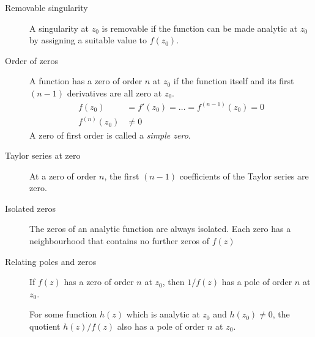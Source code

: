 \begin{description}
    \item[Removable singularity] A singularity at $ z_0 $ is removable if the function
        can be made analytic at $ z_0 $ by assigning a suitable value to $ f(z_0) $.

    \item[Order of zeros] A function has a zero of order $ n $ at $ z_0 $ if the
        function itself and its first $ (n-1) $ derivatives are all zero at $ z_0 $.
        \begin{align}
            f(z_0)       & = f'(z_0) = \dots = f^{(n-1)}(z_0) = 0 \\
            f^{(n)}(z_0) & \neq 0
        \end{align}
        A zero of first order is called a \emph{simple zero}.

    \item[Taylor series at zero] At a zero of order $ n $, the first $ (n-1) $
        coefficients of the Taylor series are zero.

    \item[Isolated zeros] The zeros of an analytic function are always isolated. Each
        zero has a neighbourhood that contains no further zeros of $ f(z) $

    \item[Relating poles and zeros] If $ f(z) $ has a zero of order $ n $ at $ z_0 $,
        then $ 1/f(z) $ has a pole of order $ n $ at $ z_0 $. \par
        For some function $ h(z) $ which is analytic at $ z_0 $ and $ h(z_0) \neq 0 $,
        the quotient $ h(z)/f(z) $ also has a pole of order $ n $ at $ z_0 $.


\end{description}

